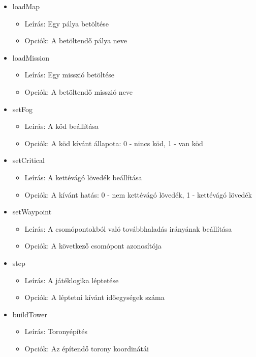 \begin{itemize}

\item loadMap
	\begin{itemize}
	\item Leírás: Egy pálya betöltése
	\item Opciók: A betöltendő pálya neve
	\end{itemize}

\item loadMission
	\begin{itemize}
	\item Leírás: Egy misszió betöltése
	\item Opciók: A betöltendő misszió neve
	\end{itemize}

\item setFog
	\begin{itemize}
	\item Leírás: A köd beállítása
	\item Opciók: A köd kívánt állapota: 0 - nincs köd, 1 - van köd
	\end{itemize}

\item setCritical
	\begin{itemize}
	\item Leírás: A kettévágó lövedék beállítása
	\item Opciók: A kívánt hatás: 0 - nem kettévágó lövedék, 1 - kettévágó lövedék
	\end{itemize}

\item setWaypoint
	\begin{itemize}
	\item Leírás: A csomópontokból való továbbhaladás irányának beállítása
	\item Opciók: A következő csomópont azonosítója
	\end{itemize}

\item step
	\begin{itemize}
	\item Leírás: A játéklogika léptetése
	\item Opciók: A léptetni kívánt időegységek száma
	\end{itemize}

\item buildTower
	\begin{itemize}
	\item Leírás: Toronyépítés
	\item Opciók: Az építendő torony koordinátái
	\end{itemize}


\end{itemize}

